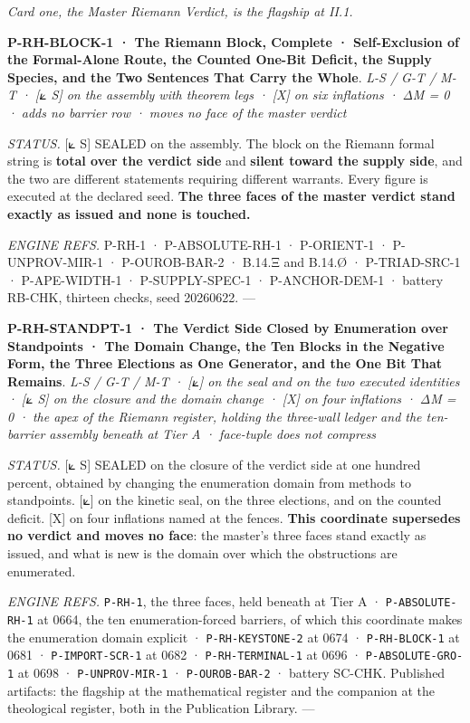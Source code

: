 \documentclass[10pt,twocolumn]{article}
\begin{document}
\emph{Card one, the Master Riemann Verdict, is the flagship at II.1.}

\textbf{P-RH-BLOCK-1 · The Riemann Block, Complete · Self-Exclusion of
the Formal-Alone Route, the Counted One-Bit Deficit, the Supply Species,
and the Two Sentences That Carry the Whole}. \emph{L-S / G-T / M-T ·
{[}⟀ S{]} on the assembly with theorem legs · {[}X{]} on six inflations
· ΔM = 0 · adds no barrier row · moves no face of the master verdict}

\emph{STATUS.} {[}⟀ S{]} SEALED on the assembly. The block on the
Riemann formal string is \textbf{total over the verdict side} and
\textbf{silent toward the supply side}, and the two are different
statements requiring different warrants. Every figure is executed at the
declared seed. \textbf{The three faces of the master verdict stand
exactly as issued and none is touched.}

\emph{ENGINE REFS.} P-RH-1 · P-ABSOLUTE-RH-1 · P-ORIENT-1 ·
P-UNPROV-MIR-1 · P-OUROB-BAR-2 · B.14.Ξ and B.14.Ø · P-TRIAD-SRC-1 ·
P-APE-WIDTH-1 · P-SUPPLY-SPEC-1 · P-ANCHOR-DEM-1 · battery RB-CHK,
thirteen checks, seed 20260622. ---

\textbf{P-RH-STANDPT-1 · The Verdict Side Closed by Enumeration over
Standpoints · The Domain Change, the Ten Blocks in the Negative Form,
the Three Elections as One Generator, and the One Bit That Remains}.
\emph{L-S / G-T / M-T · {[}⟀{]} on the seal and on the two executed
identities · {[}⟀ S{]} on the closure and the domain change · {[}X{]} on
four inflations · ΔM = 0 · the apex of the Riemann register, holding the
three-wall ledger and the ten-barrier assembly beneath at Tier A ·
face-tuple does not compress}

\emph{STATUS.} {[}⟀ S{]} SEALED on the closure of the verdict side at
one hundred percent, obtained by changing the enumeration domain from
methods to standpoints. {[}⟀{]} on the kinetic seal, on the three
elections, and on the counted deficit. {[}X{]} on four inflations named
at the fences. \textbf{This coordinate supersedes no verdict and moves
no face}: the master's three faces stand exactly as issued, and what is
new is the domain over which the obstructions are enumerated.

\emph{ENGINE REFS.} \texttt{P-RH-1}, the three faces, held beneath at
Tier A · \texttt{P-ABSOLUTE-RH-1} at 0664, the ten enumeration-forced
barriers, of which this coordinate makes the enumeration domain explicit
· \texttt{P-RH-KEYSTONE-2} at 0674 · \texttt{P-RH-BLOCK-1} at 0681 ·
\texttt{P-IMPORT-SCR-1} at 0682 · \texttt{P-RH-TERMINAL-1} at 0696 ·
\texttt{P-ABSOLUTE-GRO-1} at 0698 · \texttt{P-UNPROV-MIR-1} ·
\texttt{P-OUROB-BAR-2} · battery SC-CHK. Published artifacts: the
flagship at the mathematical register and the companion at the
theological register, both in the Publication Library. ---
\end{document}
